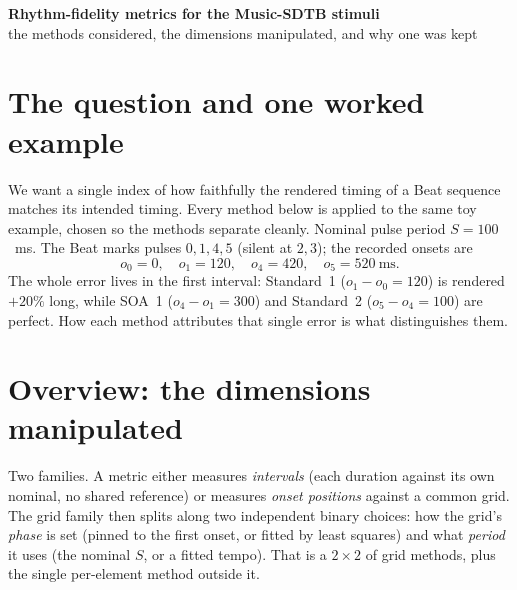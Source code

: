 \documentclass[11pt]{article}
\begin{document}
\begin{center}
{\large\bfseries Rhythm-fidelity metrics for the Music-SDTB stimuli}\\[2pt]
the methods considered, the dimensions manipulated, and why one was kept
\end{center}

\vspace{2pt}

\section*{The question and one worked example}

We want a single index of how faithfully the rendered timing of a Beat sequence
matches its intended timing. Every method below is applied to the same toy
example, chosen so the methods separate cleanly. Nominal pulse period
$S = 100$~ms. The Beat marks pulses $0,1,4,5$ (silent at $2,3$); the recorded
onsets are
\[
  o_0 = 0,\quad o_1 = 120,\quad o_4 = 420,\quad o_5 = 520 \ \text{ms}.
\]
The whole error lives in the first interval: Standard~1 ($o_1-o_0 = 120$) is
rendered $+20\%$ long, while SOA~1 ($o_4-o_1 = 300$) and Standard~2
($o_5-o_4 = 100$) are perfect. How each method attributes that single error is
what distinguishes them.

\section*{Overview: the dimensions manipulated}

Two families. A metric either measures \emph{intervals} (each duration against
its own nominal, no shared reference) or measures \emph{onset positions} against
a common grid. The grid family then splits along two independent binary choices:
how the grid's \emph{phase} is set (pinned to the first onset, or fitted by least
squares) and what \emph{period} it uses (the nominal $S$, or a fitted tempo).
That is a $2\times2$ of grid methods, plus the single per-element method outside
it.
\end{document}
